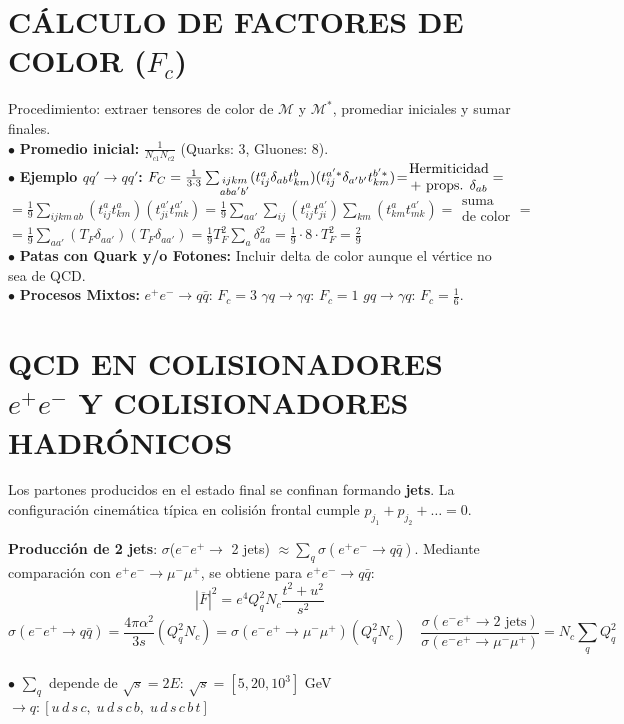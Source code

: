 \section{CÁLCULO DE FACTORES DE COLOR ($F_c$)}
Procedimiento: extraer tensores de color de $\mathcal{M}$ y $\mathcal{M}^*$, promediar iniciales y sumar finales. \\
$\bullet$ \textbf{Promedio inicial:} $\frac{1}{N_{c1} N_{c2}}$ (Quarks: 3, Gluones: 8). \\
$\bullet$ \textbf{Ejemplo $qq' \to qq'$:} \quad $F_C =  \frac{1}{3 \cdot 3} \sum_{\substack{ijkm \\ a ba'b'}} (t^a_{ij}\delta_{ab}t_{km}^b)(t^{a'*}_{ij}\delta_{a'b'}t_{km}^{b'*})\!=\!\hspace{-5pt}\begin{array}{cc}
     \text{Hermiticidad}\\
      \text{+ props. $\delta_{ab}$}
\end{array} \hspace{-5pt}=$ \\
$= \frac{1}{9} \sum_{ijkm\,ab} (t_{ij}^a t_{km}^a)(t_{ji}^{a'}t_{mk}^{a'}) = \frac{1}{9} \sum_{a a'}\sum_{ij}(t_{ij}^a t_{ji}^{a'})\sum_{km}(t_{km}^a t_{mk}^{a'}) = \begin{array}{cc}
     \text{suma}\\
      \text{de color}
\end{array} = $\\
$=\frac{1}{9} \sum_{a a'}(T_F \delta_{aa'})(T_F \delta_{aa'})=\frac{1}{9} T_F^2 \sum_{a }\delta_{aa}^2 = \frac{1}{9}\cdot 8 \cdot T_F^2 = \frac{2}{9}$
\\
$\bullet$ \textbf{Patas con Quark y/o Fotones:} Incluir delta de color aunque el vértice no sea de QCD. \\
$\bullet$ \textbf{Procesos Mixtos:} $e^+e^- \to q\bar{q}$: $F_c = 3$ \quad  $\gamma q \to \gamma q$: $F_c = 1$ \quad $g q \to \gamma q$: $F_c = \frac{1}{6}$.

\section{QCD EN COLISIONADORES $e^+e^-$ Y COLISIONADORES HADRÓNICOS}
Los partones producidos en el estado final se confinan formando \textbf{jets}. La configuración cinemática típica en colisión frontal cumple $p_{j_1} + p_{j_2} + \dots = 0$.

\textbf{Producción de 2 jets}: $\sigma$($e^-e^+ \to$ 2 jets) $\approx \sum_q \sigma(e^+e^- \to q \bar{q})$. Mediante comparación con $e^+e^- \to \mu^- \mu ^+$, se obtiene para $e^+e^- \to q \bar{q}$:
$$|\overline{F}|^2 = e^4 Q_q^2 N_c \frac{t^2+u^2}{s^2}$$
 $$\sigma(e^-\!e^+\! \to \!q\bar{q}) \!=\! \frac{4\pi\alpha^2}{3s} (Q_q^2 N_c) \!=\! \sigma(e^-\!e^+\! \to\! \mu^-\!\mu^+\!)(Q_q^2 N_c) \quad \frac{\sigma(e^-\!e^+\! \to\! \text{2 jets})}{\sigma(e^-\!e^+\! \to\! \mu^-\!\mu^+)} \!=\! N_c\! \sum_q Q_q^2$$
\\ $\bullet$ $\sum_q$ depende de $\sqrt{s} = 2E$:\;  $\sqrt{s} = [5, 20, 10^3]$ GeV $\to q: [u\,d\,s\,c,\; u\,d\,s\,c\,b, \; u\,d\,s\,c\,b\,t]$


